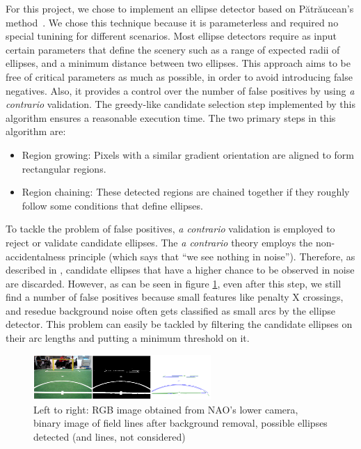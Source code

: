 \documentclass[	DIV=calc,%
							paper=a4,%
							fontsize=9pt,%
							twocolumn]{scrartcl}	 					%
\begin{document}
For this project, we chose to implement an ellipse detector based on P{\u{a}}tr{\u{a}}ucean's method~\cite{ED}. We chose this technique because it is parameterless and required no special tunining for different scenarios. Most ellipse detectors require as input certain parameters that define the scenery such as a range of expected radii of ellipses, and a minimum distance between two ellipses. This approach aims to be free of critical parameters as much as possible, in order to avoid introducing false negatives. Also, it provides a control over the number of false positives by using \emph{a contrario} validation. The greedy-like candidate selection step implemented by this algorithm ensures a reasonable execution time. The two primary steps in this algorithm are: 

\begin{itemize}
\item Region growing: Pixels with a similar gradient orientation are aligned to form rectangular regions.
\item Region chaining: These detected regions are chained together if they roughly follow some conditions that define ellipses.
\end{itemize}

To tackle the problem of false positives, \emph{a contrario} validation is employed to reject or validate candidate ellipses. The \emph{a contrario} theory employs the non-accidentalness principle (which says that ``we see nothing in noise''). Therefore, as described in \cite{ED}, candidate ellipses that have a higher chance to be observed in noise are discarded. %
However, as can be seen in figure \ref{fig:ED}, even after this step, we still find a number of false positives because small features like penalty X crossings, and resedue background noise often gets classified as small arcs by the ellipse detector. This problem can easily be tackled by filtering the candidate ellipses on their arc lengths and putting a minimum threshold on it.

\begin{figure}
\caption{Left to right: RGB image obtained from NAO's lower camera, binary image of field lines after background removal, possible ellipses detected (and lines, not considered) }
\label{fig:ED}
\includegraphics[width = 255px]{figures/ellipseDetection.png}
\end{figure}
\end{document}

